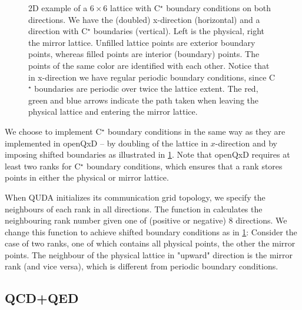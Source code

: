 \begin{figure}
  
  \caption{2D example of a $6 \times 6$ lattice with C$^\star$ boundary conditions on both directions. We have the (doubled) x-direction (horizontal) and a direction with C$^\star$ boundaries (vertical). Left is the physical, right the mirror lattice. Unfilled lattice points are exterior boundary points, whereas filled points are interior (boundary) points. The points of the same color are identified with each other. Notice that in x-direction we have regular periodic boundary conditions, since C$^\star$ boundaries are periodic over twice the lattice extent. The red, green and blue arrows indicate the path
  taken when leaving the physical lattice and entering the mirror lattice.}
  \label{fig:cstar}
\end{figure}

We choose to implement C$^\star$ boundary conditions in the same way as they are implemented in openQxD -- by doubling of the lattice in $x$-direction and by imposing shifted boundaries as illustrated in \cref{fig:cstar}. Note that openQxD requires at least two ranks for C$^\star$ boundary conditions,
which ensures that a rank stores points in either the physical or mirror lattice.

When QUDA initializes its communication grid topology, we specify the neighbours of each rank in all directions. The function  in  \cite{QUDApaper} calculates the neighbouring rank number given one of (positive or negative) 8 directions. We change this function to achieve shifted boundary conditions as in \cref{fig:cstar}: Consider the case of two ranks, one of which contains all physical points, the other the mirror points. The neighbour of the physical lattice in "upward" direction is the mirror rank (and vice versa), which is different from periodic boundary conditions.

\subsection{QCD+QED}
\label{sec:qcd+qed}

